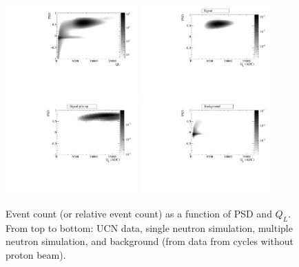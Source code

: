 \documentclass[twocolumn]{bmcart}
\begin{document}
\begin{figure}[!htpb]
\centering
\includegraphics[width=0.45\textwidth]{figures/2DGrayscale.pdf}
\includegraphics[width=0.45\textwidth]{figures/hsig_psdql.pdf}
\includegraphics[width=0.45\textwidth]{figures/hsigpile_psdql.pdf}
\includegraphics[width=0.45\textwidth]{figures/hbg_psdql.pdf}
\caption{ Event count (or relative event count) as a function of PSD
  and $Q_L$. From top to bottom: UCN data,
  single neutron simulation, multiple neutron simulation, and background (from
  data from cycles without proton beam).} \label{fig:eventSpectra}
\end{figure}
\end{document}
